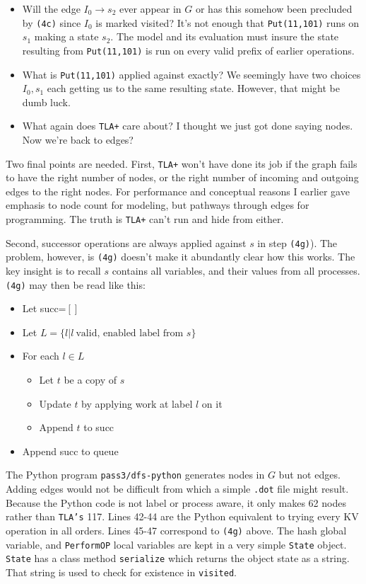 \documentclass[twocolumn]{article}
\begin{document}
\begin{itemize}
\item Will the edge $I_0 \rightarrow s_2$ ever appear in $G$ or has this somehow been precluded by \texttt{(4c)} since $I_0$ is marked visited? It's not enough that \texttt{Put(11,101)} runs on $s_1$ making a state $s_2$. The model and its evaluation must insure the state resulting from \texttt{Put(11,101)} is run on every valid prefix of earlier operations.
\item What is \texttt{Put(11,101)} applied against exactly? We seemingly have two choices $I_0, s_1$ each getting us to the same resulting state. However, that might be dumb luck.
\item What again does \texttt{TLA+} care about? I thought we just got done saying nodes. Now we're back to edges?
\end{itemize}

Two final points are needed. First, \texttt{TLA+} won't have done its job if the graph fails to have the right number of nodes, or the right number of incoming and outgoing edges to the right nodes. For performance and conceptual reasons I earlier gave emphasis to node count for modeling, but pathways through edges for programming. The truth is \texttt{TLA+} can't run and hide from either. 

Second, successor operations are always applied against $s$ in step \texttt{(4g)}). The problem, however, is \texttt{(4g)} doesn't make it abundantly clear how this works. The key insight is to recall $s$ contains all variables, and their values from all processes. \texttt{(4g)} may then be read like this:

\begin{itemize}
\item Let succ=$[]$
\item Let $L=\{l|l\ \text{valid, enabled label from\ } s\}$
\item For each $l \in L$
	\begin{itemize}
	\item Let $t$ be a copy of $s$
	\item Update $t$ by applying work at label $l$ on it
	\item Append $t$ to succ
	\end{itemize}
	\item Append succ to queue
\end{itemize}

The Python program \texttt{pass3/dfs-python} generates nodes in $G$ but not edges. Adding edges would not be difficult from which a simple \texttt{.dot} file might result. Because the Python code is not label or process aware, it only makes 62 nodes rather than \texttt{TLA's} 117. Lines 42-44 are the Python equivalent to trying every KV operation in all orders. Lines 45-47 correspond to \texttt{(4g)} above. The hash global variable, and \texttt{PerformOP} local variables are kept in a very simple \texttt{State} object. \texttt{State} has a class method \texttt{serialize} which returns the object state as a string. That string is used to check for existence in \texttt{visited}.
\end{document}
